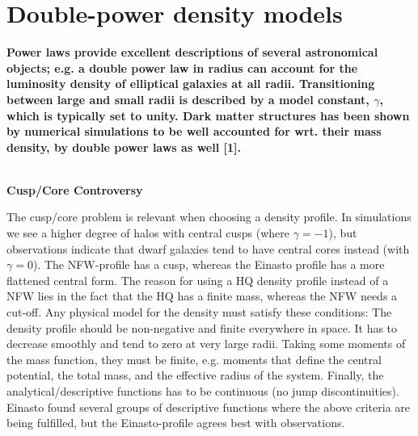 \section{Double-power density models}
\textbf{Power laws provide excellent descriptions of several astronomical objects;
e.g. a double power law in radius can account for the luminosity density of elliptical galaxies at all radii. Transitioning between large and small radii is described by a model constant, $\gamma$, which is typically set to unity. Dark matter structures has been shown by numerical simulations to be well accounted for wrt. their mass density, by double power laws as well [1].} \\ \\

\centerline{\textbf{Cusp/Core Controversy}} 
The cusp/core problem is relevant when choosing a density profile. In simulations we see a higher degree of halos with central cusps (where $\gamma = -1$), but observations indicate that dwarf galaxies tend to have central cores instead (with $\gamma = 0$). The NFW-profile has a cusp, whereas the Einasto profile has a more flattened central form. The reason for using a HQ density profile instead of a NFW lies in the fact that the HQ has a finite mass, whereas the NFW needs a cut-off. Any physical model for the density must satisfy these conditions: The density profile should be non-negative and finite everywhere in space. It has to decrease smoothly and tend to zero at very large radii. Taking some moments of the mass function, they must be finite, e.g. moments that define the central potential, the total mass, and the effective radius of the system. Finally, the analytical/descriptive functions has to be continuous (no jump discontinuities). Einasto found several groups of descriptive functions where the above criteria are being fulfilled, but the Einasto-profile agrees best with observations. \\

